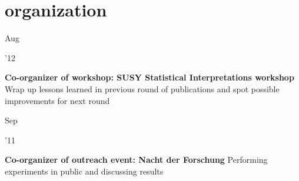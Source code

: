 \documentclass[]{cv} %
\begin{document}
\section{organization}

\begin{entrylist}

  \entry
  {\parbox[t]{\parboxWidthOne}{Aug}\parbox[t]{\parboxWidthTwo}{\hfill '12}}
  {\textbf{Co-organizer of workshop: SUSY Statistical Interpretations workshop}}
  {}
  {Wrap up lessons learned in previous round of publications and spot possible
  improvements for next round}

  \entry
  {\parbox[t]{\parboxWidthOne}{Sep}\parbox[t]{\parboxWidthTwo}{\hfill '11}}
  {\textbf{Co-organizer of outreach event: Nacht der Forschung}}
  {}
  {Performing experiments in public and discussing results}

\end{entrylist}

\newpage
\end{document}
